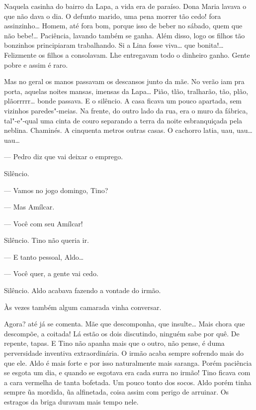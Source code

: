 Naquela casinha do bairro da Lapa, a vida era de paraíso. Dona Maria
lavava o que não dava o dia. O defunto marido, uma pena morrer tão cedo!
fora assinzinho\ldots{} Homem, até fora bom, porque isso de beber no sábado,
quem que não bebe!\ldots{} Paciência, lavando também se ganha. Além disso,
logo os filhos tão bonzinhos principiaram trabalhando. Si a Lina fosse
viva\ldots{} que bonita!\ldots{} Felizmente os filhos a consolavam. Lhe entregavam
todo o dinheiro ganho. Gente pobre e assim é raro.



Mas no geral os manos passavam os descansos junto da mãe. No verão iam
pra porta, aquelas noites mansas, imensas da Lapa\ldots{} Pião, tlão,
tralharão, tão, plão, plãorrrrr\ldots{} bonde passava. E o silêncio. A casa
ficava um pouco apartada, sem vizinhos paredes"-meias. Na frente, do
outro lado da rua, era o muro da fábrica, tal"-e"-qual uma cinta de couro
separando a terra da noite esbranquiçada pela neblina. Chaminés. A
cinquenta metros outras casas. O cachorro latia, uau, uau\ldots{} uau\ldots{}

--- Pedro diz que vai deixar o emprego.

Silêncio.

--- Vamos no jogo domingo, Tino?


--- Mas Amílcar.

--- Você com seu Amílcar!

Silêncio. Tino não queria ir.

--- E tanto pessoal, Aldo\ldots{}

--- Você quer, a gente vai cedo.

Silêncio. Aldo acabava fazendo a vontade do irmão.

Às vezes também algum camarada vinha conversar. 

Agora? até já se comenta. Mãe que descomponha, que insulte\ldots{} Mais chora
que descompõe, a coitada! Lá estão os dois discutindo, ninguém sabe por
quê. De repente, tapas. E Tino não apanha mais que o outro, não pense, é
duma perversidade inventiva extraordinária. O irmão acaba sempre
sofrendo mais do que ele. Aldo é mais forte e por isso naturalmente mais
saranga. Porém paciência se esgota um dia, e quando se esgotava era cada
surra no irmão! Tino ficava com a cara vermelha de tanta bofetada. Um
pouco tonto dos socos. Aldo porém tinha sempre ũa mordida, ũa
alfinetada, coisa assim com perigo de arruinar. Os estragos da briga
duravam mais tempo nele.

